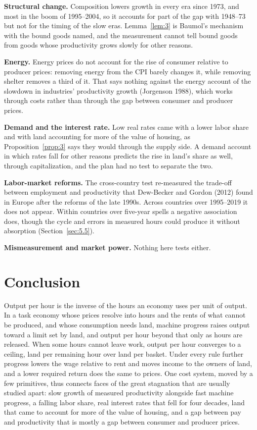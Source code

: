 \documentclass[12pt]{article}
\theoremstyle{plain}
\begin{document}
\textbf{Structural change.} Composition lowers growth in every era since 1973, and most in the boom of 1995--2004, so it accounts for part of the gap with 1948--73 but not for the timing of the slow eras. Lemma~\ref{lem:3} is Baumol's mechanism with the bound goods named, and the measurement cannot tell bound goods from goods whose productivity grows slowly for other reasons.

\textbf{Energy.} Energy prices do not account for the rise of consumer relative to producer prices: removing energy from the CPI barely changes it, while removing shelter removes a third of it. That says nothing against the energy account of the slowdown in industries' productivity growth (Jorgenson 1988), which works through costs rather than through the gap between consumer and producer prices.

\textbf{Demand and the interest rate.} Low real rates came with a lower labor share and with land accounting for more of the value of housing, as Proposition~\ref{prop:3} says they would through the supply side. A demand account in which rates fall for other reasons predicts the rise in land's share as well, through capitalization, and the plan had no test to separate the two.

\textbf{Labor-market reforms.} The cross-country test re-measured the trade-off between employment and productivity that Dew-Becker and Gordon (2012) found in Europe after the reforms of the late 1990s. Across countries over 1995--2019 it does not appear. Within countries over five-year spells a negative association does, though the cycle and errors in measured hours could produce it without absorption (Section~\ref{sec:5.5}).

\textbf{Mismeasurement and market power.} Nothing here tests either.

\section{Conclusion}\label{sec:7}

Output per hour is the inverse of the hours an economy uses per unit of output. In a task economy whose prices resolve into hours and the rents of what cannot be produced, and whose consumption needs land, machine progress raises output toward a limit set by land, and output per hour beyond that only as hours are released. When some hours cannot leave work, output per hour converges to a ceiling, land per remaining hour over land per basket. Under every rule further progress lowers the wage relative to rent and moves income to the owners of land, and a lower required return does the same to prices. One cost system, moved by a few primitives, thus connects faces of the great stagnation that are usually studied apart: slow growth of measured productivity alongside fast machine progress, a falling labor share, real interest rates that fell for four decades, land that came to account for more of the value of housing, and a gap between pay and productivity that is mostly a gap between consumer and producer prices.
\end{document}
